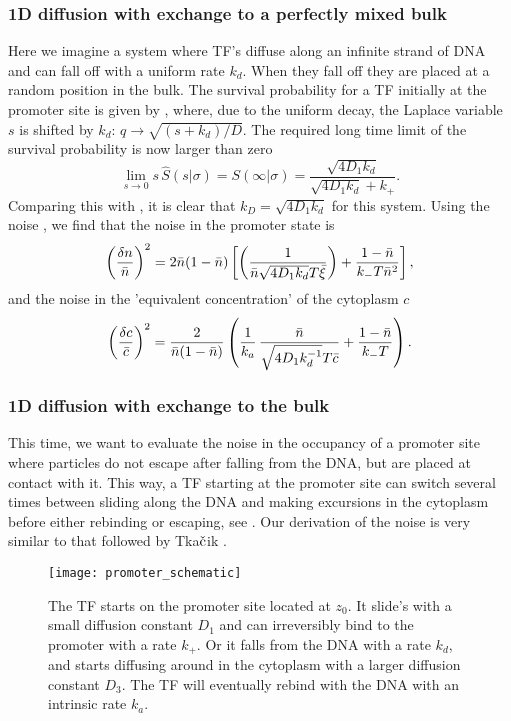 \subsubsection{1D diffusion with exchange to a perfectly mixed bulk}
Here we imagine a system where TF's diffuse along an infinite strand of DNA and can fall off with a uniform rate $k_d$. When they fall off they are placed at a random position in the bulk. The survival probability for a TF initially at the promoter site is given by , where, due to the uniform decay, the Laplace variable $s$ is shifted by $k_d$: $q \to \sqrt{(s+k_d)/D}$. The required long time limit of the survival probability is now larger than zero
\begin{equation}
 \lim_{s\to0} s \, \hat{S}(s|\sigma) = S(\infty|\sigma) = \frac{\sqrt{4 D_1 k_d}}{\sqrt{4 D_1 k_d} + k_+}.
\end{equation}
Comparing this with , it is clear that $k_D = \sqrt{4 D_1 k_d}$ for this system. Using the noise , we find that the noise in the promoter state is
\begin{equation}
 \elabel{NoiseProWM}
 \left( \frac{\delta n}{\bar{n}} \right)^2 = 2 \bar{n}(1-\bar{n})\left[\left( \frac{1}{\bar{n} \sqrt{4 D_1 k_d} T \bar{\xi}} \right)+\frac{1-\bar{n}}{k_- T \bar{n}^2} \right],
\end{equation}
and the noise in the 'equivalent concentration' of the cytoplasm $c$
\begin{equation}
 \elabel{NoiseCWM} 
 \left( \frac{\delta c}{\bar{c}} \right)^2 = \frac{2}{\bar{n}(1-\bar{n})} \left( \frac{1}{k_a} \, \frac{\bar{n}}{\sqrt{4 D_1 k_d^{-1}} T \bar{c}} + \frac{1-\bar{n}}{k_- T}  \right).
\end{equation}


\subsubsection{1D diffusion with exchange to the bulk}
This time, we want to evaluate the noise in the occupancy of a promoter site where particles do not escape after falling from the DNA, but are placed at contact with it. This way, a TF starting at the promoter site can switch several times between sliding along the DNA and making excursions in the cytoplasm before either rebinding or escaping, see . Our derivation of the noise is very similar to that followed by Tka$\check{\rm c}$ik \cite{Tkacik2009}.

\begin{figure}[ht]
\centering
\texttt{[image: promoter\_schematic]}
\caption{ The TF starts on the promoter site located at $z_0$. It slide's with a small diffusion constant $D_1$ and can irreversibly bind to the promoter with a rate $k_+$. Or it falls from the DNA with a rate $k_d$, and starts diffusing around in the cytoplasm with a larger diffusion constant $D_3$. The TF will eventually rebind with the DNA with an intrinsic rate $k_a$.}
\end{figure}

